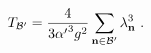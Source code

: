 \begin{equation}
T_{\mathcal{B}^{\prime }}=\frac{4}{3{\alpha ^{\prime }}^{3}g^{2}}\sum_{%
\mathbf{n}\in \mathcal{B}^{\prime }}\lambda _{\mathbf{n}}^{3}\,\,.
\end{equation}%
